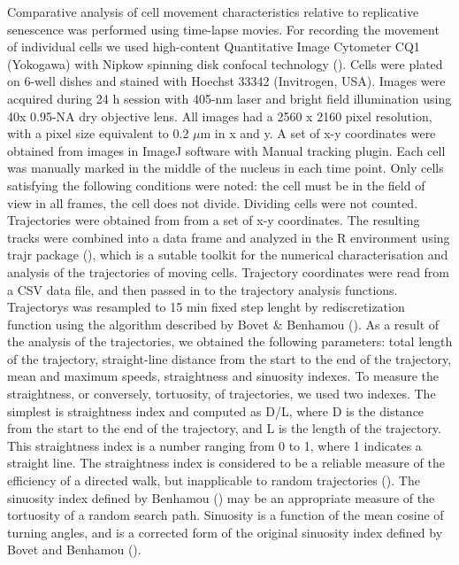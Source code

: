\documentclass[english,authoryear]{elsarticle}
\begin{document}
Comparative analysis of cell movement characteristics relative to replicative senescence was performed using time-lapse movies.
For recording the movement of individual cells we used high-content Quantitative Image Cytometer CQ1 (Yokogawa) with Nipkow spinning disk confocal technology (\cite{sakashita2015cq1}).
Cells were plated on 6-well dishes and stained with Hoechst 33342 (Invitrogen, USA).
Images were acquired during 24 h session with 405-nm laser and bright field illumination using 40x 0.95-NA dry objective lens.
All images had a 2560 x 2160 pixel resolution, with a pixel size equivalent to 0.2 $\mu$m in x and y.
A set of x-y coordinates were obtained from images in ImageJ software with Manual tracking plugin.
Each cell was manually marked in the middle of the nucleus in each time point.
Only cells satisfying the following conditions were noted: the cell must be in the field of view in all frames, the cell does not divide.
Dividing cells were not counted.
Trajectories were obtained from from a set of x-y coordinates.
The resulting tracks were combined into a data frame and analyzed in the R environment using trajr package (\cite{mclean2018trajr}), which is a sutable toolkit for the numerical characterisation and analysis of the trajectories of moving cells.
Trajectory coordinates were read from a CSV data file, and then passed in to the trajectory analysis functions.
Trajectorys was resampled to 15 min fixed step lenght by rediscretization function using the algorithm described by Bovet & Benhamou (\cite{bovet1988spatial}).
As a result of the analysis of the trajectories, we obtained the following parameters: total length of the trajectory, straight-line distance from the start to the end of the trajectory, mean and maximum speeds, straightness and sinuosity indexes.
To measure the straightness, or conversely, tortuosity, of trajectories, we used two indexes.
The simplest is straightness index and computed as D/L, where D is the distance from the start to the end of the trajectory, and L is the length of the trajectory.
This straightness index is a number ranging from 0 to 1, where 1 indicates a straight line.
The straightness index is considered to be a reliable measure of the efficiency of a directed walk, but inapplicable to random trajectories (\cite{benhamou2006detecting}).
The sinuosity index defined by Benhamou (\cite{benhamou2004reliably}) may be an appropriate measure of the tortuosity of a random search path.
Sinuosity is a function of the mean cosine of turning angles, and is a corrected form of the original sinuosity index defined by Bovet and Benhamou (\cite{bovet1988spatial}).
\end{document}
